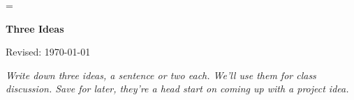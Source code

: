 \documentclass[11pt]{article}
\begin{document}
\parskip=\bigskipamount
\parindent=0.0in
\thispagestyle{empty}


\bigskip\bigskip
\centerline{\Large \bf Three Ideas}
\centerline{Revised: \today}

\medskip
{\it Write down three ideas, a sentence or two each. We'll use them for class discussion.
Save for later, they're a head start on coming up with a project idea.}



\end{document}
